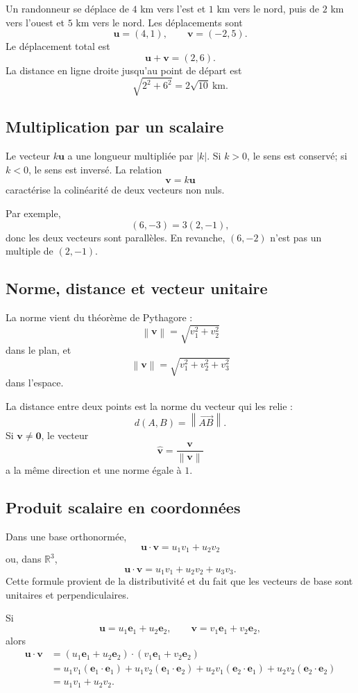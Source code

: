 \documentclass[12pt,a4paper,openany]{book}
\newcommand{\R}{\mathbb{R}}
\newcommand{\vect}[1]{\overrightarrow{#1}}
\newcommand{\norm}[1]{\left\lVert #1\right\rVert}
\newcommand{\abs}[1]{\left\lvert #1\right\rvert}
\begin{document}
\begin{examplebox}
Un randonneur se déplace de $4$ km vers l'est et $1$ km vers le nord, puis de $2$ km vers l'ouest et $5$ km vers le nord. Les déplacements sont
\[
\mathbf u=(4,1),
\qquad
\mathbf v=(-2,5).
\]
Le déplacement total est
\[
\mathbf u+\mathbf v=(2,6).
\]
La distance en ligne droite jusqu'au point de départ est
\[
\sqrt{2^2+6^2}=2\sqrt{10}\ \mathrm{km}.
\]
\end{examplebox}

\subsection{Multiplication par un scalaire}

Le vecteur $k\mathbf u$ a une longueur multipliée par $\abs k$. Si $k>0$, le sens est conservé; si $k<0$, le sens est inversé. La relation
\[
\mathbf v=k\mathbf u
\]
caractérise la colinéarité de deux vecteurs non nuls.

Par exemple,
\[
(6,-3)=3(2,-1),
\]
donc les deux vecteurs sont parallèles. En revanche, $(6,-2)$ n'est pas un multiple de $(2,-1)$.

\subsection{Norme, distance et vecteur unitaire}

La norme vient du théorème de Pythagore :
\[
\norm{\mathbf v}=\sqrt{v_1^2+v_2^2}
\]
dans le plan, et
\[
\norm{\mathbf v}=\sqrt{v_1^2+v_2^2+v_3^2}
\]
dans l'espace.

La distance entre deux points est la norme du vecteur qui les relie :
\[
d(A,B)=\norm{\vect{AB}}.
\]
Si $\mathbf v\neq\mathbf0$, le vecteur
\[
\widehat{\mathbf v}=\frac{\mathbf v}{\norm{\mathbf v}}
\]
a la même direction et une norme égale à $1$.

\subsection{Produit scalaire en coordonnées}

Dans une base orthonormée,
\[
\mathbf u\cdot\mathbf v=u_1v_1+u_2v_2
\]
ou, dans $\R^3$,
\[
\mathbf u\cdot\mathbf v=u_1v_1+u_2v_2+u_3v_3.
\]
Cette formule provient de la distributivité et du fait que les vecteurs de base sont unitaires et perpendiculaires.

Si
\[
\mathbf u=u_1\mathbf e_1+u_2\mathbf e_2,
\qquad
\mathbf v=v_1\mathbf e_1+v_2\mathbf e_2,
\]
alors
\begin{align*}
\mathbf u\cdot\mathbf v
&=(u_1\mathbf e_1+u_2\mathbf e_2)\cdot(v_1\mathbf e_1+v_2\mathbf e_2)\\
&=u_1v_1(\mathbf e_1\cdot\mathbf e_1)
+u_1v_2(\mathbf e_1\cdot\mathbf e_2)
+u_2v_1(\mathbf e_2\cdot\mathbf e_1)
+u_2v_2(\mathbf e_2\cdot\mathbf e_2)\\
&=u_1v_1+u_2v_2.
\end{align*}
\end{document}
